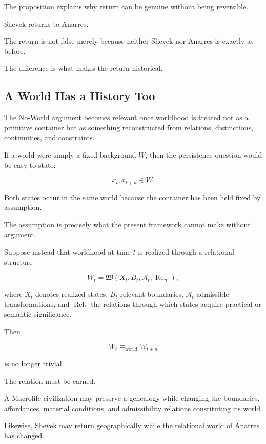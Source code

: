 \documentclass[
  11pt,
  a4paper,
  DIV=12,
  BCOR=0mm,
  parskip=half-
]{scrartcl}
\newcommand{\Adm}{\mathcal A}
\newcommand{\eqworld}{%
  \equiv_{\mathrm{world}}%
}
\newcommand{\Rel}{\operatorname{Rel}}
\theoremstyle{definition}
\theoremstyle{plain}
\theoremstyle{remark}
\begin{document}
The proposition explains why return can be genuine without being reversible.

Shevek returns to Anarres.

The return is not false merely because neither Shevek nor Anarres is exactly
as before.

The difference is what makes the return historical.


\subsection{A World Has a History Too}
\label{sec:world-provenance}

The No-World argument becomes relevant once worldhood is treated not as a
primitive container but as something reconstructed from relations,
distinctions, continuities, and constraints.

If a world were simply a fixed background \(W\), then the persistence question
would be easy to state:

\[
  x_t,x_{t+n}\in W.
\]

Both states occur in the same world because the container has been held fixed
by assumption.

The assumption is precisely what the present framework cannot make without
argument.

Suppose instead that worldhood at time \(t\) is realized through a relational
structure

\[
  W_t
  =
  \mathfrak W
  (
  X_t,
  B_t,
  \Adm_t,
  \Rel_t
  ),
\]

where \(X_t\) denotes realized states, \(B_t\) relevant boundaries,
\(\Adm_t\) admissible transformations, and \(\Rel_t\) the relations through
which states acquire practical or semantic significance.

Then

\[
  W_t\eqworld W_{t+n}
\]

is no longer trivial.

The relation must be earned.

A Macrolife civilization may preserve a genealogy while changing the
boundaries, affordances, material conditions, and admissibility relations
constituting its world.

Likewise, Shevek may return geographically while the relational world of
Anarres has changed.
\end{document}
